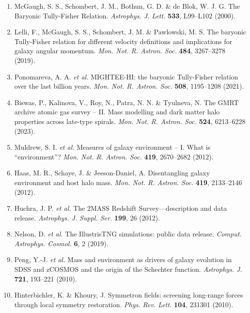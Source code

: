 \documentclass[11pt,a4paper]{article}
\begin{document}
\begin{enumerate}
\item McGaugh, S. S., Schombert, J. M., Bothun, G. D. \& de Blok, W. J. G. The Baryonic Tully-Fisher Relation. \textit{Astrophys. J. Lett.} \textbf{533}, L99--L102 (2000).

\item Lelli, F., McGaugh, S. S., Schombert, J. M. \& Pawlowski, M. S. The baryonic Tully-Fisher relation for different velocity definitions and implications for galaxy angular momentum. \textit{Mon. Not. R. Astron. Soc.} \textbf{484}, 3267--3278 (2019).

\item Ponomareva, A. A. \textit{et al.} MIGHTEE-HI: the baryonic Tully-Fisher relation over the last billion years. \textit{Mon. Not. R. Astron. Soc.} \textbf{508}, 1195--1208 (2021).

\item Biswas, P., Kalinova, V., Roy, N., Patra, N. N. \& Tyulneva, N. The GMRT archive atomic gas survey -- II. Mass modelling and dark matter halo properties across late-type spirals. \textit{Mon. Not. R. Astron. Soc.} \textbf{524}, 6213--6228 (2023).

\item Muldrew, S. I. \textit{et al.} Measures of galaxy environment -- I. What is ``environment''? \textit{Mon. Not. R. Astron. Soc.} \textbf{419}, 2670--2682 (2012).

\item Haas, M. R., Schaye, J. \& Jeeson-Daniel, A. Disentangling galaxy environment and host halo mass. \textit{Mon. Not. R. Astron. Soc.} \textbf{419}, 2133--2146 (2012).

\item Huchra, J. P. \textit{et al.} The 2MASS Redshift Survey---description and data release. \textit{Astrophys. J. Suppl. Ser.} \textbf{199}, 26 (2012).

\item Nelson, D. \textit{et al.} The IllustrisTNG simulations: public data release. \textit{Comput. Astrophys. Cosmol.} \textbf{6}, 2 (2019).

\item Peng, Y.-J. \textit{et al.} Mass and environment as drivers of galaxy evolution in SDSS and zCOSMOS and the origin of the Schechter function. \textit{Astrophys. J.} \textbf{721}, 193--221 (2010).

\item Hinterbichler, K. \& Khoury, J. Symmetron fields: screening long-range forces through local symmetry restoration. \textit{Phys. Rev. Lett.} \textbf{104}, 231301 (2010).


\end{enumerate}
\end{document}
